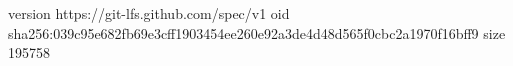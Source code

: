 version https://git-lfs.github.com/spec/v1
oid sha256:039c95e682fb69e3cff1903454ee260e92a3de4d48d565f0cbc2a1970f16bff9
size 195758
